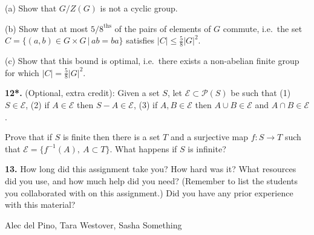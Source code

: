 \documentclass[11pt,letterpaper]{article}
\begin{document}
(a) Show that $G/Z(G)$ is not a cyclic group.

(b) Show that at most $5/8^{\mathrm{ths}}$ of the pairs of elements of $G$
commute, i.e.\ the set $C=\{(a,b)\in G\times G\,|\,ab=ba\}$ satisfies
$|C|\leq \frac58 |G|^2$.

(c) Show that this bound is optimal, i.e.\ there exists a non-abelian finite
group for which $|C|=\frac58 |G|^2$.%
\medskip

{\bf 12*.} (Optional, extra credit):  Given a set $S$, let $\mathcal{E}\subset \mathcal{P}(S)$ be such
that (1) $S\in \mathcal{E}$, (2) if $A\in \mathcal{E}$ then $S-A\in
\mathcal{E}$, (3) if $A,B\in \mathcal{E}$ then $A\cup B\in \mathcal{E}$ and 
$A\cap B\in \mathcal{E}$. 

Prove that if $S$ is finite then there is a set
$T$ and a surjective map $f:S\to T$ such that $\mathcal{E}=\{f^{-1}(A),\ 
A\subset T\}$. What happens if $S$ is infinite?
\medskip






{\bf 13.} How long did this assignment take you?  How hard was it?
What resources did you use, and how much help did you need?
(Remember to list the students you collaborated with on this assignment.)
Did you have any prior experience with this material?

Alec del Pino, Tara Westover, Sasha Something
\end{document}
